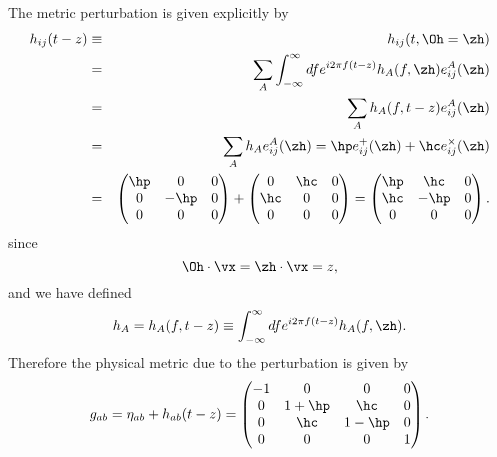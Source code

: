 \documentclass[
reprint,           %
superscriptaddress,%
amsmath,           %
amssymb,           %
aps,               %
prl,               %
notitlepage,       %
floatfix,          %
nofootinbib,
onecolumn
]{revtex4-1}
\def\e{\begin{equation}}
\def\q{\end{equation}}
\def\m{\begin{eqnarray}}
\def\n{\end{eqnarray}}
\begin{document}
The metric perturbation is given explicitly by
\m 
    h_{ij}(t-z) &\equiv& h_{ij}(t, \Oh=\zh)\\
        &=& \sum_A \int_{-\infty}^{\infty} df
        e^{i2\pi f(t-z)} h_A(f, \zh) e^A_{ij}(\zh)\\
        &=& \sum_A h_A(f, t-z) e^A_{ij}(\zh)\\
        &=& \sum_A h_A e^A_{ij}(\zh)
        = \hp e^+_{ij}(\zh) + \hc e^\times_{ij}(\zh)\\
        &=& \begin{pmatrix}
            \hp & 0 & 0\\
            0 & -\hp & 0\\
            0 & 0 & 0
        \end{pmatrix} + \begin{pmatrix}
        0 & \hc & 0\\
        \hc & 0 & 0\\
        0 & 0 & 0
    \end{pmatrix}
= \begin{pmatrix}
    \hp & \hc & 0\\
    \hc & -\hp & 0\\
    0 & 0 & 0
\end{pmatrix}.
\n 
since
\e 
    \Oh\cdot\vx = \zh\cdot\vx = z,
\q 
and we have defined 
\e
    h_A = h_A(f, t-z) 
        \equiv \int_{-\infty}^{\infty} df e^{i2\pi f(t-z)} h_A(f, \zh).
\q
Therefore the physical metric due to the perturbation is given by
\e 
g_{ab} = \eta_{ab} + h_{ab}(t-z) = \begin{pmatrix}
    -1 & 0 & 0 & 0\\
    0 & 1+\hp & \hc &0\\
    0 & \hc & 1-\hp &0\\
    0 & 0 & 0 & 1
\end{pmatrix}.
\q
\end{document}
